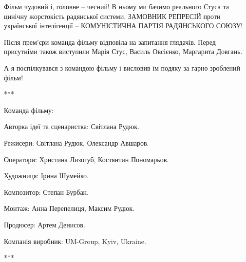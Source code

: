 
Фільм чудовий і, головне – чесний! В ньому ми бачимо реального Стуса та цинічну
жорстокість радянської системи. ЗАМОВНИК РЕПРЕСІЙ проти української
інтелігенції – КОМУНІСТИЧНА ПАРТІЯ РАДЯНСЬКОГО СОЮЗУ!

Після прем'єри команда фільму відповіла на запитання глядачів. Перед присутніми
також виступили Марія Стус, Василь Овсієнко, Маргарита Довгань.

А я поспілкувався з командою фільму і висловив їм подяку за гарно зроблений
фільм! 

***

Команда фільму:

Авторка ідеї та сценаристка: Світлана Рудюк.

Режисери: Світлана Рудюк, Олександр Авшаров.

Оператори: Христина Лизогуб, Костянтин Пономарьов.

Художниця: Ірина Шумейко.

Композитор: Степан Бурбан.

Монтаж: Анна Перепелиця, Максим Рудюк.

Продюсер: Артем Денисов.

Компанія виробник: UM-Group, Kyiv, Ukraine.

***
